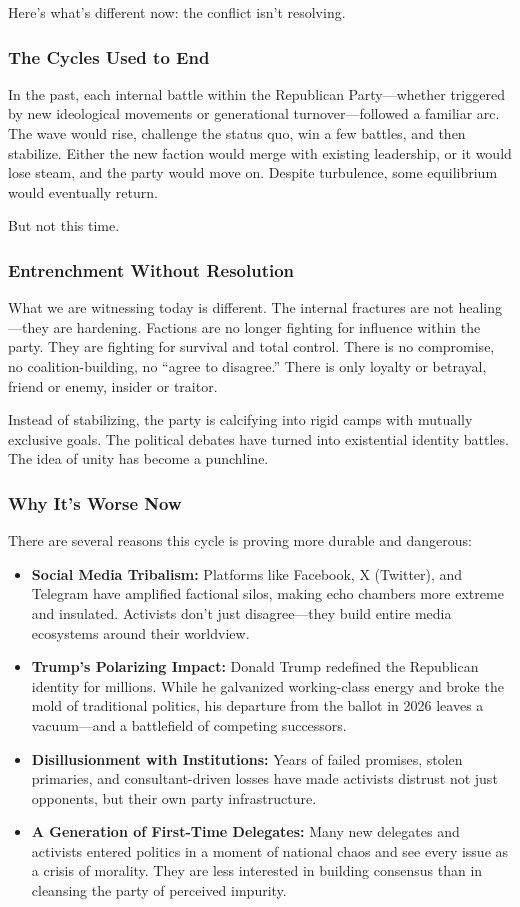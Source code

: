 Here’s what’s different now: the conflict isn’t resolving.

\subsubsection{The Cycles Used to End}
In the past, each internal battle within the Republican Party—whether triggered by new ideological movements or generational turnover—followed a familiar arc. The wave would rise, challenge the status quo, win a few battles, and then stabilize. Either the new faction would merge with existing leadership, or it would lose steam, and the party would move on. Despite turbulence, some equilibrium would eventually return.

But not this time.

\subsubsection{Entrenchment Without Resolution}
What we are witnessing today is different. The internal fractures are not healing—they are hardening. Factions are no longer fighting for influence within the party. They are fighting for survival and total control. There is no compromise, no coalition-building, no “agree to disagree.” There is only loyalty or betrayal, friend or enemy, insider or traitor.

Instead of stabilizing, the party is calcifying into rigid camps with mutually exclusive goals. The political debates have turned into existential identity battles. The idea of unity has become a punchline.

\subsubsection{Why It’s Worse Now}
There are several reasons this cycle is proving more durable and dangerous:
\begin{itemize}
\item \textbf{Social Media Tribalism:} Platforms like Facebook, X (Twitter), and Telegram have amplified factional silos, making echo chambers more extreme and insulated. Activists don’t just disagree—they build entire media ecosystems around their worldview.
\item \textbf{Trump’s Polarizing Impact:} Donald Trump redefined the Republican identity for millions. While he galvanized working-class energy and broke the mold of traditional politics, his departure from the ballot in 2026 leaves a vacuum—and a battlefield of competing successors.
\item \textbf{Disillusionment with Institutions:} Years of failed promises, stolen primaries, and consultant-driven losses have made activists distrust not just opponents, but their own party infrastructure.
\item \textbf{A Generation of First-Time Delegates:} Many new delegates and activists entered politics in a moment of national chaos and see every issue as a crisis of morality. They are less interested in building consensus than in cleansing the party of perceived impurity.
\end{itemize}

